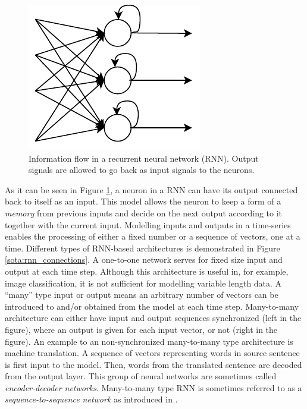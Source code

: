 \begin{figure}[t]
  \centering
  \includegraphics[width=0.3\linewidth]{img/RecurrentNeuralNet.pdf}
  \caption[Information flow in a recurrent neural network (RNN).]{Information flow in a recurrent neural network (RNN). Output signals are allowed to go back as input signals to the neurons. }
  \label{sota:rnn}
\end{figure}

As it can be seen in Figure \ref{sota:rnn}, a neuron in a RNN can have its output connected back to itself as an input. This model allows the neuron to keep a form of a \textit{memory} from previous inputs and decide on the next output according to it together with the current input. Modelling inputs and outputs in a time-series enables the processing of either a fixed number or a sequence of vectors, one at a time. Different types of RNN-based architectures is demonstrated in Figure \ref{sota:rnn_connections}. A one-to-one network serves for fixed size input and output at each time step. Although this architecture is useful in, for example, image classification, it is not sufficient for modelling variable length data. A ``many'' type input or output means an arbitrary number of vectors can be introduced to and/or obtained from the model at each time step. Many-to-many architecture can either have input and output sequences synchronized (left in the figure), where an output is given for each input vector, or not (right in the figure). An example to an non-synchronized many-to-many type architecture is machine translation. A sequence of vectors representing words in source sentence is first input to the model. Then, words from the translated sentence are decoded from the output layer. This group of neural networks are sometimes called \textit{encoder-decoder networks}. Many-to-many type RNN is sometimes referred to as a \textit{sequence-to-sequence network} as introduced in \cite{sutskever}. 

